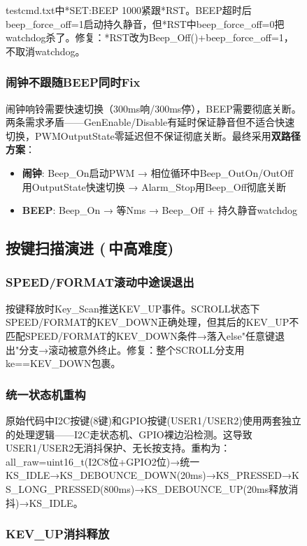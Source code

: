 \documentclass[12pt,hyperref,a4paper,UTF8]{ctexart}
\begin{document}
\begin{figure}[!htbp]
testcmd.txt中*SET:BEEP 1000紧跟*RST。BEEP超时后beep\_force\_off=1启动持久静音，但*RST中beep\_force\_off=0把watchdog杀了。修复：*RST改为Beep\_Off()+beep\_force\_off=1，不取消watchdog。

\subsubsection{闹钟不跟随BEEP同时Fix}

闹钟响铃需要快速切换（300ms响/300ms停），BEEP需要彻底关断。两条需求矛盾——GenEnable/Disable有延时保证静音但不适合快速切换，PWMOutputState零延迟但不保证彻底关断。最终采用\textbf{双路径方案}：

\begin{itemize}
    \item \textbf{闹钟}: Beep\_On启动PWM → 相位循环中Beep\_OutOn/OutOff用OutputState快速切换 → Alarm\_Stop用Beep\_Off彻底关断
    \item \textbf{BEEP}: Beep\_On → 等Nms → Beep\_Off + 持久静音watchdog
\end{itemize}

\subsection{按键扫描演进 \qquad (\faStar\,\faStar 中高难度)}

\subsubsection{SPEED/FORMAT滚动中途误退出}

按键释放时Key\_Scan推送KEV\_UP事件。SCROLL状态下SPEED/FORMAT的KEV\_DOWN正确处理，但其后的KEV\_UP不匹配SPEED/FORMAT的KEV\_DOWN条件→落入else"任意键退出"分支→滚动被意外终止。修复：整个SCROLL分支用ke==KEV\_DOWN包裹。

\subsubsection{统一状态机重构}

原始代码中I2C按键(8键)和GPIO按键(USER1/USER2)使用两套独立的处理逻辑——I2C走状态机、GPIO裸边沿检测。这导致USER1/USER2无消抖保护、无长按支持。重构为：all\_raw=uint16\_t(I2C8位+GPIO2位)→统一KS\_IDLE→KS\_DEBOUNCE\_DOWN(20ms)→KS\_PRESSED→KS\_LONG\_PRESSED(800ms)→KS\_DEBOUNCE\_UP(20ms释放消抖)→KS\_IDLE。

\subsubsection{KEV\_UP消抖释放}


\end{figure}
\end{document}
